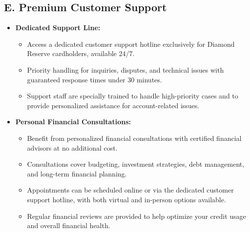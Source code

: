 \documentclass[12pt,a4paper]{article}
\begin{document}
\subsection*{E. Premium Customer Support}
\begin{itemize}
    \item \textbf{Dedicated Support Line:}
    \begin{itemize}
        \item Access a dedicated customer support hotline exclusively for Diamond Reserve cardholders, available 24/7.
        \item Priority handling for inquiries, disputes, and technical issues with guaranteed response times under 30 minutes.
        \item Support staff are specially trained to handle high-priority cases and to provide personalized assistance for account-related issues.
    \end{itemize}
    
    \item \textbf{Personal Financial Consultations:}
    \begin{itemize}
        \item Benefit from personalized financial consultations with certified financial advisors at no additional cost.
        \item Consultations cover budgeting, investment strategies, debt management, and long-term financial planning.
        \item Appointments can be scheduled online or via the dedicated customer support hotline, with both virtual and in-person options available.
        \item Regular financial reviews are provided to help optimize your credit usage and overall financial health.
    \end{itemize}
\end{itemize}
\end{document}
